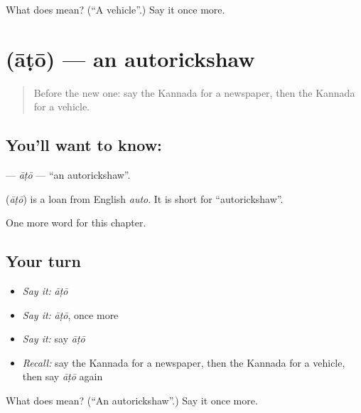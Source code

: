 \begin{tcolorbox}[breakable,colback=teal!4,colframe=teal!35!black,title={Before you move on}]
What does  mean? (\textquotedblleft{}A vehicle\textquotedblright{}.) Say it once more.
\end{tcolorbox}
\section[\texorpdfstring{\kn{ಆಟೋ} (āṭō)}{ಆಟೋ (āṭō)}]{ (āṭō) — an autorickshaw}

\label{lesson:KA-C260-ato}



\begin{quote}
Before the new one: say the Kannada for a newspaper, then the Kannada for a vehicle.
\end{quote}

\subsection*{You'll want to know: }
\textbf{} — \emph{āṭō} — \textquotedblleft{}an autorickshaw\textquotedblright{}.

\begin{cousinweb}
\textbf{} (\emph{āṭō}) is a loan from English \emph{auto}. It is short for \textquotedblleft{}autorickshaw\textquotedblright{}.
\end{cousinweb}

\begin{grammarlens}[title={What you've built}]
One more word for this chapter.
\end{grammarlens}

\subsection*{Your turn}
\begin{itemize}
\raggedright
  \item \emph{Say it:} \emph{āṭō}
  \item \emph{Say it:} \emph{āṭō}, once more
  \item \emph{Say it:} say \emph{āṭō}
  \item \emph{Recall:} say the Kannada for a newspaper, then the Kannada for a vehicle, then say \emph{āṭō} again
\end{itemize}

\begin{tcolorbox}[breakable,colback=teal!4,colframe=teal!35!black,title={Before you move on}]
What does  mean? (\textquotedblleft{}An autorickshaw\textquotedblright{}.) Say it once more.
\end{tcolorbox}
